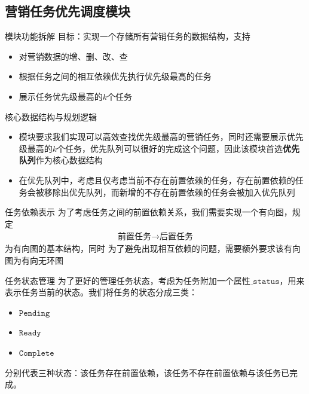 \documentclass[aspectratio=169]{beamer}
\begin{document}
\subsection{营销任务优先调度模块}
\begin{frame}{模块功能拆解}
    目标：实现一个存储所有营销任务的数据结构，支持
    \begin{itemize}
        \item 对营销数据的增、删、改、查
        \item 根据任务之间的相互依赖优先执行优先级最高的任务
        \item 展示任务优先级最高的$k$个任务
    \end{itemize}
\end{frame}

\begin{frame}{核心数据结构与规划逻辑}
    \begin{itemize}
        \item 模块要求我们实现可以高效查找优先级最高的营销任务，同时还需要展示优先级最高的$k$个任务，优先队列可以很好的完成这个问题，因此该模块首选\textbf{优先队列}作为核心数据结构
        \item 在优先队列中，考虑且仅考虑当前不存在前置依赖的任务，存在前置依赖的任务会被移除出优先队列，而新增的不存在前置依赖的任务会被加入优先队列
    \end{itemize}
\end{frame}



\begin{frame}{任务依赖表示}
    为了考虑任务之间的前置依赖关系，我们需要实现一个有向图，规定
    \begin{align*}
        \text{前置任务} \longrightarrow \text{后置任务}
    \end{align*}
    为有向图的基本结构，同时
    为了避免出现相互依赖的问题，需要额外要求该有向图为有向无环图
\end{frame}

\begin{frame}{任务状态管理}
    为了更好的管理任务状态，考虑为任务附加一个属性$\mathtt{\_status}$，用来表示任务当前的状态。我们将任务的状态分成三类：
    \begin{itemize}
        \item $\mathtt{Pending}$
        \item $\mathtt{Ready}$
        \item $\mathtt{Complete}$
    \end{itemize}
    分别代表三种状态：该任务存在前置依赖，该任务不存在前置依赖与该任务已完成。
\end{frame}
\end{document}
